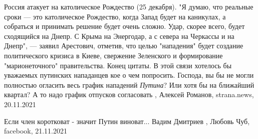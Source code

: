  
 
 
 
 

Россия атакует на католическое Рождество (25 декабря).  "Я думаю, что реальные
сроки — это католическое Рождество, когда Запад будет на каникулах, а собраться
и принимать решение будет очень сложно.  Удар, скорее всего, будет сходящийся
на Днепр. С Крыма на Энергодар, а с севера на Черкассы и на Днепр", — заявил
Арестович, отметив, что целью "нападения" будет создание политического кризиса
в Киеве, свержение Зеленского и формирование "марионеточного" правительства.
Конец цитаты.  В этой связи хотелось бы уважаемых путинских нападанцев кое о
чем попросить.  Господа, вы бы не могли полностью огласить весь график
нападений \emph{Путина}?  Или хотя бы на ближайший квартал?  А то надо график
отпусков согласовать
, 
Алексей Романов, strana.news, 20.11.2021

Если член коротковат - значит Путин виноват...
Вадим Дмитриев
, 
Любовь Чуб, facebook, 21.11.2021

